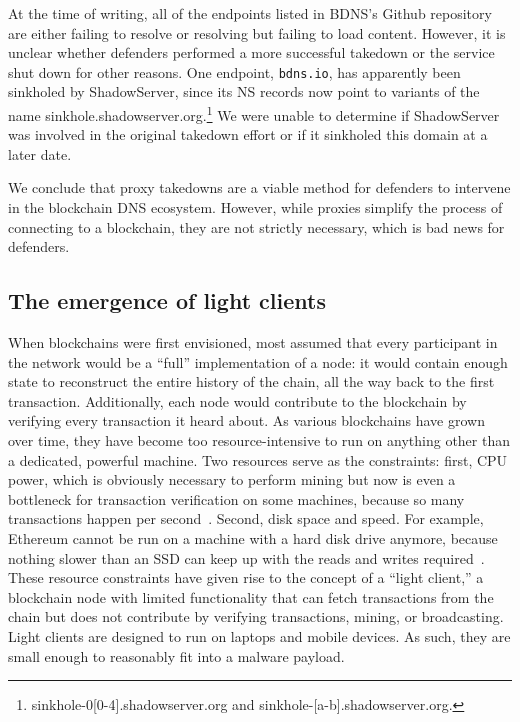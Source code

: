 At the time of writing, all of the endpoints listed in BDNS's 
Github repository~\cite{github_bdns_wayback} are either 
failing to resolve or resolving but failing to 
load content. However, it is unclear whether defenders 
performed a more successful takedown or the service shut down 
for other reasons. One endpoint, \texttt{bdns.io}, has 
apparently been sinkholed by ShadowServer, since its NS 
records now point to variants of the name 
sinkhole.shadowserver.org.\footnote{sinkhole-0[0-4].shadowserver.org
and sinkhole-[a-b].shadowserver.org.} We were unable to 
determine if ShadowServer was involved in the original 
takedown effort or if it sinkholed this domain at a later 
date.

We conclude that proxy takedowns are a viable method for 
defenders to intervene in the blockchain DNS ecosystem. 
However, while proxies simplify the process of 
connecting to a blockchain, they are not strictly necessary, 
which is bad news for defenders.

\subsection{The emergence of light clients}

When blockchains were first envisioned, most assumed that every participant in 
the network would be a ``full'' implementation of a node: it would contain 
enough state to reconstruct the entire history of the chain, all the way back 
to the first transaction. Additionally, each node would contribute to the 
blockchain by verifying every transaction it heard about. As various 
blockchains have grown over time, they have become too resource-intensive to 
run on anything other than a dedicated, powerful machine. Two 
resources serve as 
the constraints: first, CPU power, which is obviously necessary to perform 
mining but now is even a bottleneck for transaction verification on some 
machines, because so many transactions happen per 
second~\cite{citation_needed}. Second, disk 
space and speed. For example, Ethereum cannot be run on a machine with a hard 
disk drive anymore, because nothing slower than an SSD can keep up with the 
reads and writes required~\cite{citation_needed}.  These resource constraints have 
given rise to the concept of a ``light client,'' a blockchain 
node with limited functionality that can fetch transactions 
from the chain but does not contribute by verifying 
transactions, mining, or broadcasting. Light clients are 
designed to run on laptops and mobile devices. As 
such, they are small enough to reasonably fit into a malware 
payload. 

